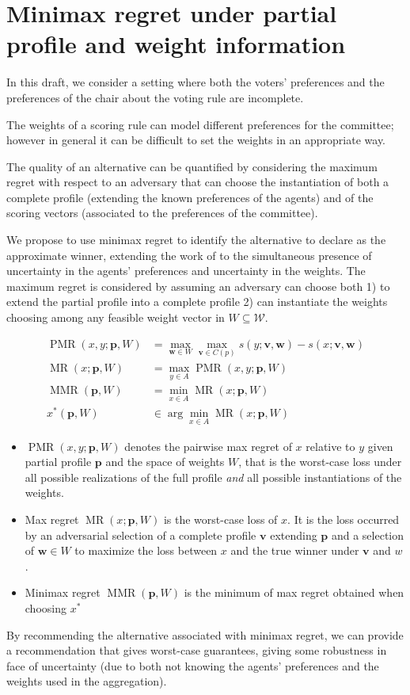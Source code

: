 \documentclass[12pt]{article}
\newcommand{\profile}{\textbf{v}}%
\newcommand{\pprofile}{\textbf{p}}%
\newcommand{\w}{\textbf{w}}%
\DeclareMathOperator{\PMR}{PMR}
\DeclareMathOperator{\MR}{MR}
\DeclareMathOperator{\MMR}{MMR}
\begin{document}
\section{Minimax regret under partial profile and weight information}
In this draft, we consider a setting where both the voters' preferences and the preferences of the chair about the voting rule are incomplete.

The weights of a scoring rule can model different preferences for the committee; however in general it can be difficult to set the weights in an appropriate way.


The quality of an alternative can be quantified by considering the maximum regret with respect to an adversary that can choose the instantiation of both a complete profile (extending the known preferences of the agents) and of the scoring vectors (associated to the preferences of the committee).


We propose to use minimax regret to identify the alternative to declare as the approximate winner, extending the work of \cite{Lu2011} to the simultaneous presence of uncertainty in the agents' preferences and uncertainty in the weights.
The maximum regret is considered by assuming an adversary can choose both 1) to extend the partial profile into a complete profile 2) can instantiate the weights choosing among any feasible weight vector in $W \subseteq \mathcal{W}$.

\begin{align*}
\PMR(x,y; \pprofile, W) &= \max_{\w \in W} \max_{\profile \in C(p)} s(y; \profile,\w) - s(x; \profile,\w)\\
\MR(x; \pprofile, W) &= \max_{y \in A} \PMR(x,y; \pprofile, W) \\
\MMR(\pprofile,W) & = \min_{x \in A} \MR(x;\pprofile,W) \\
x^{*}(\pprofile,W) & \in \arg\min_{x \in A} \MR(x;\pprofile,W) 
\end{align*}

\begin{itemize}
 \item $\PMR(x,y;\pprofile,W)$ denotes the pairwise max regret of $x$ relative to $y$ given partial profile $\pprofile$ and the space of weights $W$, that is the worst-case loss under all possible realizations of the full profile {\em and} all possible instantiations of the weights.
 \item Max regret $\MR(x;\pprofile,W)$ is the worst-case loss of $x$. It is the loss occurred by an adversarial selection of a complete profile $\profile$ extending $\pprofile$ and a selection of $\w \in W$ to maximize the loss between $x$ and the true winner under $\profile$ and $w$.
 \item Minimax regret $\MMR(\pprofile,W)$ is the minimum of max regret obtained when choosing $x^*$
\end{itemize}
By recommending the alternative associated with minimax regret, we can provide a recommendation that gives worst-case guarantees, giving some robustness in face of uncertainty (due to both not knowing the agents' preferences and the weights used in the aggregation). 
\end{document}
